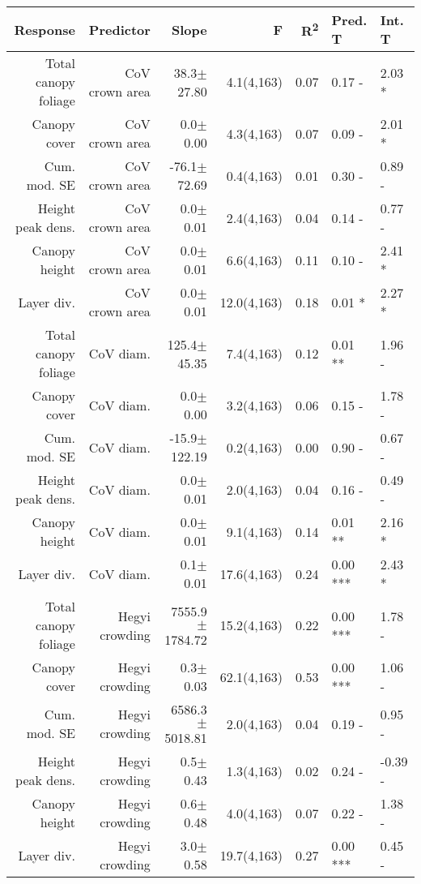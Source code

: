 \begin{table}[H]
\centering
\begin{tabular}{rrrrrll}
  \hline
Response & Predictor & Slope & F & R\textsuperscript{2} & Pred. T & Int. T \\ 
  \hline
Total canopy foliage & CoV crown area & 38.3$\pm$27.80 & 4.1(4,163) & 0.07 & 0.17 - & 2.03 * \\ 
  Canopy cover & CoV crown area & 0.0$\pm$0.00 & 4.3(4,163) & 0.07 & 0.09 - & 2.01 * \\ 
  Cum. mod. SE & CoV crown area & -76.1$\pm$72.69 & 0.4(4,163) & 0.01 & 0.30 - & 0.89 - \\ 
  Height peak dens. & CoV crown area & 0.0$\pm$0.01 & 2.4(4,163) & 0.04 & 0.14 - & 0.77 - \\ 
  Canopy height & CoV crown area & 0.0$\pm$0.01 & 6.6(4,163) & 0.11 & 0.10 - & 2.41 * \\ 
  Layer div. & CoV crown area & 0.0$\pm$0.01 & 12.0(4,163) & 0.18 & 0.01 * & 2.27 * \\ 
  Total canopy foliage & CoV diam. & 125.4$\pm$45.35 & 7.4(4,163) & 0.12 & 0.01 ** & 1.96 - \\ 
  Canopy cover & CoV diam. & 0.0$\pm$0.00 & 3.2(4,163) & 0.06 & 0.15 - & 1.78 - \\ 
  Cum. mod. SE & CoV diam. & -15.9$\pm$122.19 & 0.2(4,163) & 0.00 & 0.90 - & 0.67 - \\ 
  Height peak dens. & CoV diam. & 0.0$\pm$0.01 & 2.0(4,163) & 0.04 & 0.16 - & 0.49 - \\ 
  Canopy height & CoV diam. & 0.0$\pm$0.01 & 9.1(4,163) & 0.14 & 0.01 ** & 2.16 * \\ 
  Layer div. & CoV diam. & 0.1$\pm$0.01 & 17.6(4,163) & 0.24 & 0.00 *** & 2.43 * \\ 
  Total canopy foliage & Hegyi crowding & 7555.9$\pm$1784.72 & 15.2(4,163) & 0.22 & 0.00 *** & 1.78 - \\ 
  Canopy cover & Hegyi crowding & 0.3$\pm$0.03 & 62.1(4,163) & 0.53 & 0.00 *** & 1.06 - \\ 
  Cum. mod. SE & Hegyi crowding & 6586.3$\pm$5018.81 & 2.0(4,163) & 0.04 & 0.19 - & 0.95 - \\ 
  Height peak dens. & Hegyi crowding & 0.5$\pm$0.43 & 1.3(4,163) & 0.02 & 0.24 - & -0.39 - \\ 
  Canopy height & Hegyi crowding & 0.6$\pm$0.48 & 4.0(4,163) & 0.07 & 0.22 - & 1.38 - \\ 
  Layer div. & Hegyi crowding & 3.0$\pm$0.58 & 19.7(4,163) & 0.27 & 0.00 *** & 0.45 - \\ 

\end{tabular}
\end{table}
